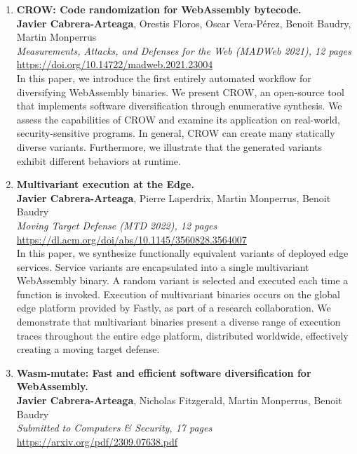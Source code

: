 \begin{enumerate}[label={\textbf{\Roman*}:}, ref={\Roman*}]
	\item \label{crowpaper} \textbf{CROW: Code randomization for WebAssembly bytecode.} \\ 
	\textbf{Javier Cabrera-Arteaga}, Orestis Floros, Oscar Vera-Pérez, Benoit Baudry, Martin Monperrus\\
	\textit{ Measurements, Attacks, and Defenses for the Web (MADWeb 2021), 12 pages} \\
	\url{https://doi.org/10.14722/madweb.2021.23004} \\
	
	 In this paper, we introduce the first entirely automated workflow for diversifying WebAssembly binaries. 
	We present CROW, an open-source tool that implements software diversification through enumerative synthesis. 
	We assess the capabilities of CROW and examine its application on real-world, security-sensitive programs.
	In general, CROW can create many statically diverse variants. 
	Furthermore, we illustrate that the generated variants exhibit different behaviors at runtime.

	
	
	\item \label{mewepaper} \textbf{Multivariant execution at the Edge. } \\
	\textbf{Javier Cabrera-Arteaga}, Pierre Laperdrix, Martin Monperrus, Benoit Baudry\\
    \textit{Moving Target Defense (MTD 2022), 12 pages} \\
    \url{https://dl.acm.org/doi/abs/10.1145/3560828.3564007} \\

	In this paper, we synthesize functionally equivalent variants of deployed edge services. 
	Service variants are encapsulated into a single multivariant WebAssembly binary. 
	A random variant is selected and executed each time a function is invoked.
	Execution of multivariant binaries occurs on the global edge platform provided by Fastly, as part of a research collaboration. 
	We demonstrate that multivariant binaries present a diverse range of execution traces throughout the entire edge platform, distributed worldwide, effectively creating a moving target defense.

	
	\item \label{wasmmutatepaper}\textbf{Wasm-mutate: Fast and efficient software diversification for WebAssembly. }\\ 
	\textbf{Javier Cabrera-Arteaga}, Nicholas Fitzgerald, Martin Monperrus, Benoit Baudry\\
	\textit{Submitted to Computers \& Security, 17 pages} \\
	\url{https://arxiv.org/pdf/2309.07638.pdf}


\end{enumerate}

